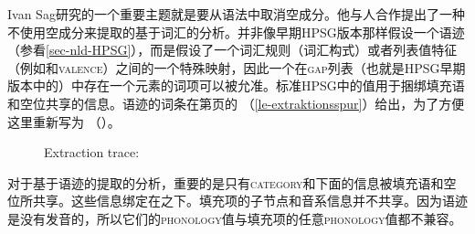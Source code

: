 Ivan Sag研究的一个重要主题就是要从语法中取消空成分。他与人合作提出了一种不使用空成分来提取的基于词汇的分析\citep*{NB94,BMS2001a}。并非像早期HPSG版本那样假设一个语迹（参看\ref{sec-nld-HPSG}），而是假设了一个词汇规则（词汇构式）或者列表值特征（例如\argstc 和\textsc{valence}）之间的一个特殊映射，因此一个在\textsc{gap}列表（也就是HPSG早期版本中的\slaschc ）中存在一个元素的词项可以被允准。标准HPSG中的\localfc 值用于捆绑填充语和空位共享的信息。语迹的词条在第\pageref{le-extraktionsspur}页的 （\ref{le-extraktionsspur}）给出，为了方便这里重新写为 （）。
\begin{figure}
\eas
\label{le-extraction-trace-two}
Extraction trace: \\
\zs
\vspace{-2\baselineskip}
\end{figure}%
对于基于语迹的提取的分析，重要的是只有\textsc{category}和\contc 下面的信息被填充语和空位所共享。这些信息绑定在\localc 之下。填充项的子节点和音系信息并不共享。因为语迹是没有发音的，所以它们的\textsc{phonology}值与填充项的任意\textsc{phonology}值都不兼容。

